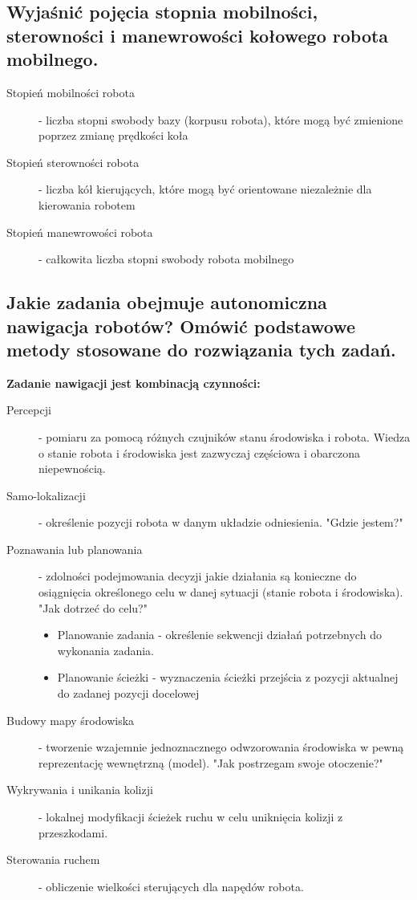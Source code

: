 \subsection{Wyjaśnić pojęcia stopnia mobilności, sterowności i manewrowości kołowego robota mobilnego.}
\begin{description}
    \item[Stopień mobilności robota] - liczba stopni swobody bazy (korpusu robota), które mogą być zmienione poprzez zmianę prędkości koła
    \item[Stopień sterowności robota] - liczba kół kierujących, które mogą być orientowane niezależnie dla kierowania robotem
    \item[Stopień manewrowości robota] - całkowita liczba stopni swobody robota mobilnego
\end{description}

\subsection{Jakie zadania obejmuje autonomiczna nawigacja robotów? Omówić podstawowe metody stosowane do rozwiązania tych zadań.}
\textbf{Zadanie nawigacji jest kombinacją czynności:}
\begin{description}
    \item[Percepcji] - pomiaru za pomocą różnych czujników stanu środowiska i robota. Wiedza o stanie robota i środowiska jest zazwyczaj częściowa i obarczona niepewnością.
    \item[Samo-lokalizacji] - określenie pozycji robota w danym układzie odniesienia. "Gdzie jestem?"
    \item[Poznawania lub planowania] - zdolności podejmowania decyzji jakie działania są konieczne do osiągnięcia określonego celu w danej sytuacji (stanie robota i środowiska). "Jak dotrzeć do celu?"
    \mbox{}
    \begin{itemize}
        \item Planowanie zadania - określenie sekwencji działań potrzebnych do wykonania zadania.
        \item Planowanie ścieżki - wyznaczenia ścieżki przejścia z pozycji aktualnej do zadanej pozycji docelowej
    \end{itemize} 
    \item[Budowy mapy środowiska] - tworzenie wzajemnie jednoznacznego odwzorowania środowiska w pewną reprezentację wewnętrzną (model). "Jak postrzegam swoje otoczenie?"
    \item[Wykrywania i unikania kolizji] - lokalnej modyfikacji ścieżek ruchu w celu uniknięcia kolizji z przeszkodami.
    \item[Sterowania ruchem] - obliczenie wielkości sterujących dla napędów robota.
\end{description}

